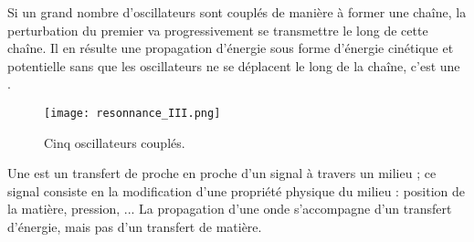 Si un grand nombre d'oscillateurs sont couplés de manière à former une chaîne, la perturbation du premier va progressivement se transmettre le long de cette chaîne. Il en résulte une propagation d'énergie sous forme d'énergie cinétique et potentielle sans que les oscillateurs ne se déplacent le long de la chaîne, c'est une .

\begin{figure}[h!]
    \centering
    \texttt{[image: resonnance\_III.png]}
    \caption{Cinq oscillateurs couplés.}
    \label{resonnanceIII}
\end{figure}


\begin{encadre}
    Une  est un transfert de proche en proche d'un signal à travers un milieu ; ce signal consiste en la modification d'une propriété physique du milieu : position de la matière, pression, ...
    La propagation d'une onde s'accompagne d'un transfert d'énergie, mais pas d'un transfert de matière.
\end{encadre}
